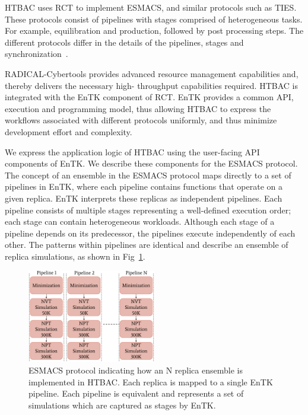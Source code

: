 
HTBAC uses RCT to implement ESMACS, and similar
protocols such as TIES\@. These protocols consist of pipelines with stages
comprised of heterogeneous tasks. For example, equilibration and production,
followed by post processing steps. The different protocols differ in the details 
of the pipelines, stages and synchronization~\cite{Bhati2017}.


RADICAL-Cybertools provides advanced resource management capabilities and,
thereby delivers the necessary high- throughput capabilities required. HTBAC is
integrated with the EnTK component of RCT. EnTK provides a common API,
execution and programming model, thus allowing HTBAC to express the workflows
associated with different protocols uniformly, and thus minimize development
effort and complexity.

We express the application logic of HTBAC using the user-facing API 
components of EnTK. We describe these components for the ESMACS
protocol\@. The concept of an ensemble in the ESMACS protocol maps directly to
a set of pipelines in EnTK, where each pipeline contains functions that operate
on a given replica. EnTK interprets these replicas as independent pipelines.
Each pipeline consists of multiple stages representing a well-defined execution
order; each stage can contain heterogeneous workloads. Although each stage of a
pipeline depends on its predecessor, the pipelines execute independently of each
other. The patterns within pipelines are identical and describe an ensemble of replica
simulations, as shown in Fig~\ref{figure:ESMACS-pipelines}.

\begin{figure}
\centering
  \includegraphics[width=0.5\textwidth]{FIGURES/HT-BAC_NAMD_pipelines_control_flow_only.pdf}
  \caption{ESMACS protocol indicating how an N replica ensemble is implemented in HTBAC.
  Each replica is mapped to a single EnTK pipeline.
  Each pipeline is equivalent and represents a set of simulations which are captured as stages by
  EnTK.}\label{figure:ESMACS-pipelines}
\end{figure}

